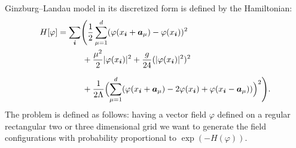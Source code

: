 \documentclass[a4paper]{llncs}
\renewcommand{\a}[1]{\v{a}_{#1}}
\renewcommand{\v}[1]{\vec{#1}}
\newcommand{\vphi}{\varphi}
\newcommand{\vi}{{\vec{i}}}
\begin{document}
Ginzburg--Landau model in its discretized form is defined by the
Hamiltonian\cite{parisi}:
\begin{equation*}\label{eq:hamiltonian}\begin{split}
H[\varphi]&=\sum_{\vi}\Biggl(
\frac{1}{2}\sum_{\mu=1}^d(\vphi(x_\vi+\a{\mu})-\vphi(x_\vi))^2\\
&\phantom{=\sum_{\vi}\bigl(}+\frac{\mu^2}{2}|\vphi(x_{\vi})|^2+
\frac{g}{24}(|\vphi(x_{\vi})|^2)^2\\
&\phantom{=\sum_{\vi}\bigl(}+
\frac{1}{2\Lambda}\Bigl(\sum_{\mu=1}^d
(\vphi(x_\vi+\a{\mu})-2\vphi(x_{\vi})+\vphi(x_\vi-\a\mu))\Bigr)^2\Biggr).
\end{split}
\end{equation*}
The
problem is defined as follows: having a vector field $\vphi$ defined
on a regular rectangular two or three dimensional grid we want to
generate the field configurations with probability proportional to
$\exp(-H(\vphi))$.  
\end{document}
